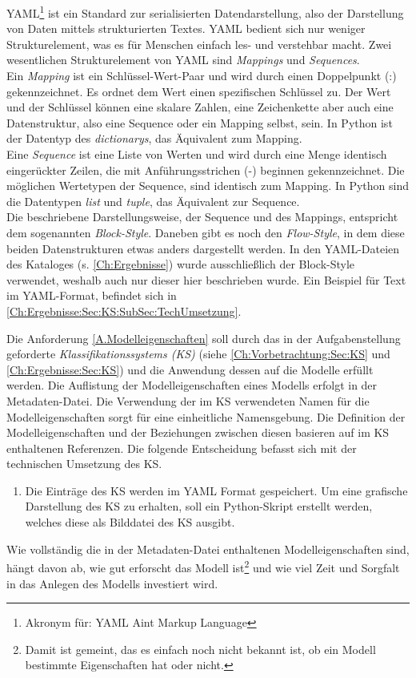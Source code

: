 \label{YAML_Erklärung}
YAML\footnote{Akronym für: YAML Ain\textquotesingle t Markup Language} \cite{YAMLDocUrl} ist ein Standard zur serialisierten Datendarstellung, also der Darstellung von Daten mittels strukturierten Textes. YAML bedient sich nur weniger Strukturelement, was es für Menschen einfach les- und verstehbar macht. Zwei wesentlichen Strukturelement von YAML sind \textit{Mappings} und \textit{Sequences}.\\
Ein \textit{Mapping} ist ein Schlüssel-Wert-Paar und wird durch einen Doppelpunkt (:) gekennzeichnet. Es ordnet dem Wert einen spezifischen Schlüssel zu. Der Wert und der Schlüssel können eine skalare Zahlen, eine Zeichenkette aber auch eine Datenstruktur, also eine Sequence oder ein Mapping selbst, sein. In Python ist der Datentyp des \textit{dictionarys}, das Äquivalent zum Mapping.\\
Eine \textit{Sequence} ist eine Liste von Werten und wird durch eine Menge identisch eingerückter Zeilen, die mit Anführungsstrichen (-) beginnen gekennzeichnet. Die möglichen Wertetypen der Sequence, sind identisch zum Mapping. In Python sind die Datentypen \textit{list} und \textit{tuple}, das Äquivalent zur Sequence.\\
Die beschriebene Darstellungsweise, der Sequence und des Mappings, entspricht dem sogenannten \textit{Block-Style}. Daneben gibt es noch den \textit{Flow-Style}, in dem diese beiden Datenstrukturen etwas anders dargestellt werden. In den YAML-Dateien des Kataloges (s. \autoref{Ch:Ergebnisse}) wurde ausschließlich der Block-Style verwendet, weshalb auch nur dieser hier beschrieben wurde. Ein Beispiel für Text im YAML-Format, befindet sich in \autoref{Ch:Ergebnisse:Sec:KS:SubSec:TechUmsetzung}.

Die Anforderung \ref{A.Modelleigenschaften} soll durch das in der Aufgabenstellung geforderte \textit{Klassifikationssystems (KS)} (siehe \autoref{Ch:Vorbetrachtung:Sec:KS} und \autoref{Ch:Ergebnisse:Sec:KS}) und die Anwendung dessen auf die Modelle erfüllt werden. Die Auflistung der Modelleigenschaften eines Modells erfolgt in der Metadaten-Datei. Die Verwendung der im KS verwendeten Namen für die Modelleigenschaften sorgt für eine einheitliche Namensgebung. Die Definition der Modelleigenschaften und der Beziehungen zwischen diesen basieren auf im KS enthaltenen Referenzen. Die folgende Entscheidung befasst sich mit der technischen Umsetzung des KS.
\begin{enumerate}[resume*]
	\item \label{E.KS_TechUmsetzung}Die Einträge des KS werden im YAML Format gespeichert. Um eine grafische Darstellung des KS zu erhalten, soll ein Python-Skript erstellt werden, welches diese als Bilddatei des KS ausgibt.
\end{enumerate}
Wie vollständig die in der Metadaten-Datei enthaltenen Modelleigenschaften sind, hängt davon ab, wie gut erforscht das Modell ist\footnote{Damit ist gemeint, das es einfach noch nicht bekannt ist, ob ein Modell bestimmte Eigenschaften hat oder nicht.} und wie viel Zeit und Sorgfalt in das Anlegen des Modells investiert wird. %

